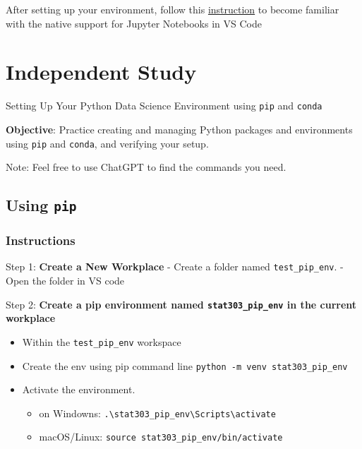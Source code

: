 \documentclass[
  letterpaper,
  DIV=11,
  numbers=noendperiod]{scrreprt}
\providecommand{\tightlist}{%
  \setlength{\itemsep}{0pt}\setlength{\parskip}{0pt}}\usepackage{longtable,booktabs,array}
\begin{document}
After setting up your environment, follow this
\href{https://code.visualstudio.com/docs/datascience/jupyter-notebooks}{instruction}
to become familiar with the native support for Jupyter Notebooks in VS
Code

\hypertarget{independent-study}{%
\section{Independent Study}\label{independent-study}}

Setting Up Your Python Data Science Environment using \texttt{pip} and
\texttt{conda}

\textbf{Objective}: Practice creating and managing Python packages and
environments using \texttt{pip} and \texttt{conda}, and verifying your
setup.

Note: Feel free to use ChatGPT to find the commands you need.

\hypertarget{using-pip}{%
\subsection{\texorpdfstring{Using
\texttt{pip}}{Using pip}}\label{using-pip}}

\hypertarget{instructions}{%
\subsubsection{Instructions}\label{instructions}}

Step 1: \textbf{Create a New Workplace} - Create a folder named
\texttt{test\_pip\_env}. - Open the folder in VS code

Step 2: \textbf{Create a pip environment named
\texttt{stat303\_pip\_env} in the current workplace}

\begin{itemize}
\tightlist
\item
  Within the \texttt{test\_pip\_env} workspace
\item
  Create the env using pip command line
  \texttt{python\ -m\ venv\ stat303\_pip\_env}
\item
  Activate the environment.

  \begin{itemize}
  \tightlist
  \item
    on Windowns:
    \texttt{.\textbackslash{}stat303\_pip\_env\textbackslash{}Scripts\textbackslash{}activate}
  \item
    macOS/Linux: \texttt{source\ stat303\_pip\_env/bin/activate}
  \end{itemize}
\end{itemize}
\end{document}
